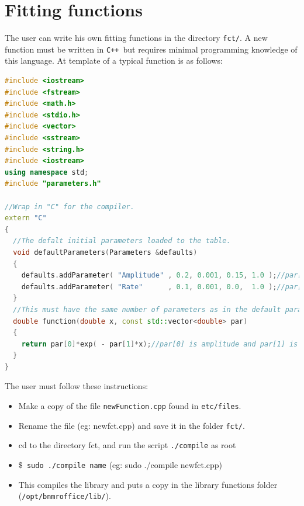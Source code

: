 \documentclass[10pt,letterpaper,oneside]{article}
\newcommand{\cpp}{\texttt{C++}}
\begin{document}
\section{Fitting functions}
The user can write his own fitting functions in the directory \verb+fct/+.
A new function must be written in \cpp\ but requires minimal programming knowledge of this language. 
At template of a typical function is as follows:
\begin{lstlisting}[language=C++, keywordstyle=\color{red}]
#include <iostream>
#include <fstream> 
#include <math.h>
#include <stdio.h>
#include <vector>
#include <sstream>   
#include <string.h>
#include <iostream>
using namespace std;
#include "parameters.h"

//Wrap in "C" for the compiler.
extern "C" 
{ 
  //The defalt initial parameters loaded to the table.
  void defaultParameters(Parameters &defaults)
  {
    defaults.addParameter( "Amplitude" , 0.2, 0.001, 0.15, 1.0 );//par[0]
    defaults.addParameter( "Rate"      , 0.1, 0.001, 0.0,  1.0 );//par[1]
  }
  //This must have the same number of parameters as in the default parameters above.
  double function(double x, const std::vector<double> par)
  {
  	return par[0]*exp( - par[1]*x);//par[0] is amplitude and par[1] is rate.
  }
}
\end{lstlisting}
The user must follow these instructions:
\begin{itemize}
\item Make a copy of the file \verb+newFunction.cpp+ found in \verb+etc/files+.
\item Rename the file (eg: newfct.cpp) and save it in the folder \verb+fct/+.
\item cd to the directory fct, and run the script \verb+./compile+ as root
\item \texttt{$\$$ sudo ./compile name}   (eg: sudo ./compile newfct.cpp)
\item This compiles the library and puts a copy in the library functions folder (\verb+/opt/bnmroffice/lib/+).
\end{itemize}
\end{document}
